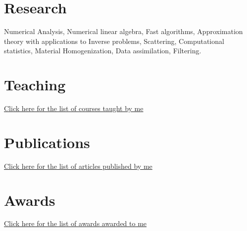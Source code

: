 \documentclass[margin,line]{resume}
\begin{document}
\begin{resume}
	\section{\mysidestyle Research}
Numerical Analysis, Numerical linear algebra, Fast algorithms, Approximation theory with applications to Inverse problems, Scattering, Computational statistics, Material Homogenization, Data assimilation, Filtering.


	\section{\mysidestyle Teaching}
	\href{http://sivaramambikasaran.com/teaching/}{Click here for the list of courses taught by me}
	
	\section{\mysidestyle Publications}
	\href{https://scholar.google.co.in/citations?user=h2hgRJoAAAAJ&hl=en}{Click here for the list of articles published by me}
	
	\section{\mysidestyle Awards}
	\href{http://sivaramambikasaran.com/awards/}{Click here for the list of awards awarded to me}
	

\end{resume}
\end{document}
